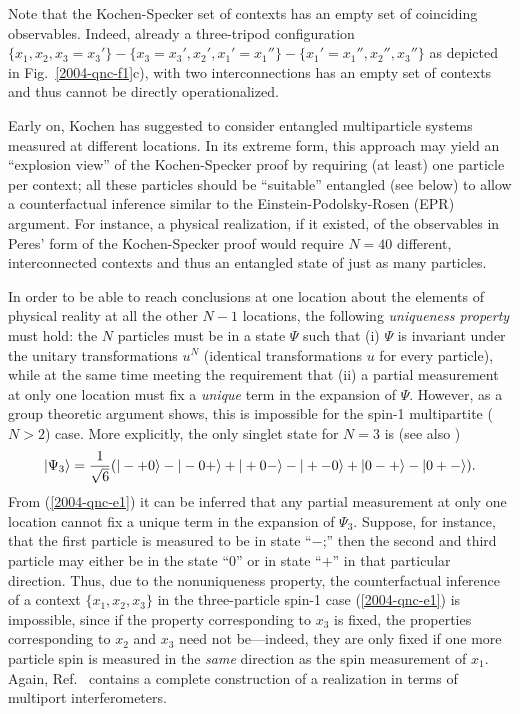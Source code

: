 \documentclass[prl,showpacs,showkeys,amsfonts]{revtex4}
\begin{document}

Note that the Kochen-Specker set of contexts has an empty set of coinciding observables.
Indeed, already a three-tripod configuration
$\{x_1,x_2,x_3=x_3'\}-\{x_3=x_3',x_2',x_1'=x_1''\}-\{x_1'=x_1'',x_2'',x_3''\}$
as depicted in Fig.~\ref{2004-qnc-f1}c),
with two interconnections has an empty set of contexts
and thus cannot be directly operationalized.

Early on, Kochen \cite{hey-red} has suggested
to consider entangled multiparticle systems measured at different locations.
In its extreme form, this approach may yield an ``explosion view'' of the
Kochen-Specker proof
by requiring (at least) one particle per context;
all these particles should be ``suitable'' entangled (see below)
to allow a counterfactual inference
similar to the Einstein-Podolsky-Rosen (EPR) argument.
For
instance, a physical realization,
if it existed, of the observables in Peres' form
of the Kochen-Specker proof \cite{peres,svozil-tkadlec}
would require $N=40$ different, interconnected contexts and thus
an entangled state of just as many particles.

In order to be able to reach conclusions at
one location about the elements of physical reality \cite{epr}
at all the other $N-1$ locations,
the following {\em uniqueness property} must hold:
the $N$ particles must be in a state  $\Psi$
such that
(i) $\Psi$ is invariant under the unitary transformations $u^N$
(identical transformations $u$ for every particle),
while at the same time meeting the requirement that
(ii) a partial measurement at only one location must
fix a {\em unique} term in the expansion of $\Psi$.
However, as a group theoretic argument \cite{2004-kasper-svo} shows,
this is impossible
for the spin-1 multipartite ($N>2$) case.
More explicitly, the only singlet state for $N=3$ is (see also \cite{kok-02})
\begin{equation}
\vert \Psi_3 \rangle
= {1\over \sqrt{6}}(
\vert - + 0\rangle
-
\vert - 0 +\rangle
+
\vert + 0 - \rangle
-
\vert + - 0\rangle
+
\vert 0 - + \rangle
-
\vert 0 + - \rangle
).
\label{2004-qnc-e1}
\end{equation}
From (\ref{2004-qnc-e1}) it can be inferred that
any partial measurement at only one location cannot
fix a  unique term in the expansion of $\Psi_3$.
Suppose, for instance, that the first particle is measured to be in state
``$-$;'' then the second and third particle may either be in the state ``$0$'' or in state ``$+$''
in that particular direction.
Thus, due to the nonuniqueness property, the counterfactual inference of a context $\{x_1,x_2,x_3\}$ in the three-particle spin-1
case (\ref{2004-qnc-e1}) is impossible,
since if the property corresponding to $x_3$ is fixed,
the properties corresponding to $x_2$ and $x_3$ need not be---indeed,
they are only fixed if one more particle spin is measured in the {\em same}
direction as the spin measurement of $x_1$.
Again, Ref.~\cite{svozil-2004-analog} contains a complete construction of a
realization in terms of multiport interferometers.
\end{document}
